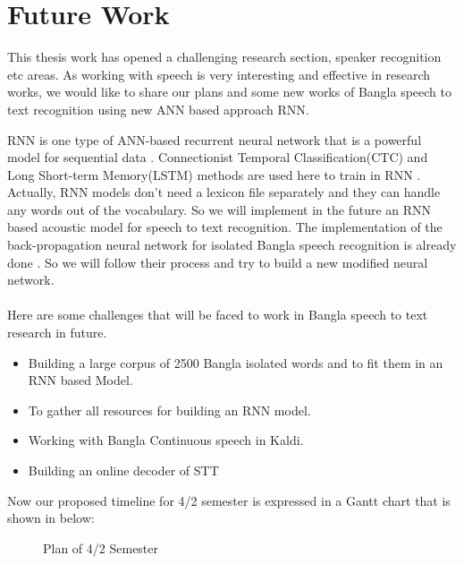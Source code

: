 \documentclass{standalone}
\begin{document}
\chapter{Future Work}
This thesis work has opened a challenging research section, speaker recognition etc areas. As working with speech is very interesting and effective in research works, we would like to share our plans and some new works of Bangla speech to text recognition using new ANN based approach RNN.
\par RNN is one type of ANN-based recurrent neural network that is a powerful model for sequential data \cite{graves2013speech, bickerton1994speech}. Connectionist Temporal Classification(CTC) and Long Short-term Memory(LSTM) methods are used here to train in RNN \cite{sak2014long, zahner1995artificial}.
Actually, RNN models don't need a lexicon file separately and they can handle any words out of the vocabulary. So we will implement in the future an RNN based acoustic model for speech to text recognition.
The implementation of the back-propagation neural network for isolated Bangla speech recognition is already done \cite{hossain2013implementation}. So we will follow their process and try to build a new modified neural network.
\\ 
\\
Here are some challenges that will be faced to work in Bangla speech to text research in future.

\begin{itemize}
\item {Building a large corpus of 2500 Bangla isolated words and to fit them in an RNN based Model.}
\item {To gather all resources for building an RNN model.}
\item {Working with Bangla Continuous speech in Kaldi.}
\item {Building an online decoder of STT}
\end{itemize}

\par Now our proposed timeline for 4/2 semester is expressed in a Gantt chart that is shown in below: \\

\begin{figure}[h]
   \centering
   \caption{Plan of 4/2 Semester}
  \label{fig:FinalSemesterGanttChart}
\end{figure}
\end{document}
